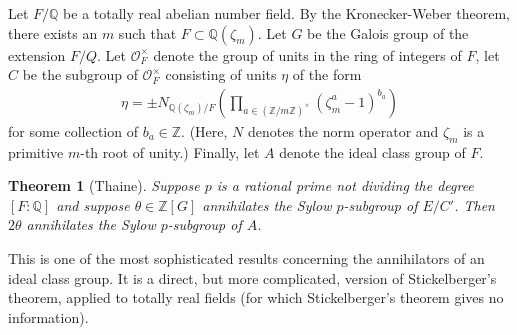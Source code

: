 \documentclass[12pt]{article}
\newtheorem{theorem}{Theorem}
\newcommand{\mc}{\mathcal}
\newcommand{\mb}{\mathbb}
\newcommand{\Z}{\mb{Z}}
\newcommand{\Q}{\mb{Q}}
\newcommand{\<}{\langle}
\renewcommand{\>}{\rangle}
\begin{document}
Let $F/\Q$ be a totally real abelian number field.  By the Kronecker-Weber theorem, there exists an $m$ such that $F\subset \Q(\zeta_m)$. Let $G$ be the Galois group of the extension $F/Q$.  Let $\mc{O}_F^\times$ denote the group of units in the ring of integers of $F$, let $C$ be the subgroup of $\mc{O}_F^\times$ consisting of units $\eta$ of the form 
\begin{align*}
\eta=\pm N_{\Q(\zeta_m)/F}\left(\prod_{a\in(\Z/m\Z)^\times}(\zeta_m^a-1)^{b_a}\right)
\end{align*}
for some collection of $b_a\in\Z$.  (Here, $N$ denotes the norm operator and $\zeta_m$ is a primitive $m$-th root of unity.)  Finally, let $A$ denote the ideal class group of $F$.

\begin{theorem}[Thaine]
Suppose $p$ is a rational prime not dividing the degree $[F:\Q]$ and suppose $\theta\in\Z[G]$ annihilates the Sylow $p$-subgroup of $E/C'$.  Then $2\theta$ annihilates the Sylow $p$-subgroup of $A$.
\end{theorem}

This is one of the most sophisticated results concerning the annihilators of an ideal class group.  It is a direct, but more complicated, version of Stickelberger's theorem, applied to totally real fields (for which Stickelberger's theorem gives no information).
\end{document}
